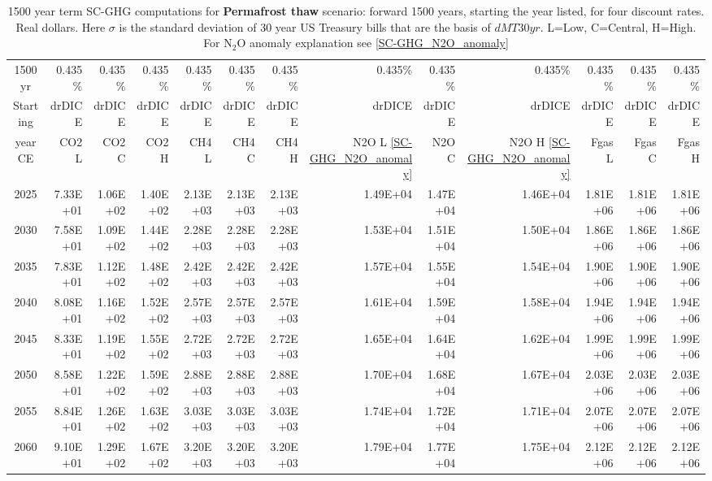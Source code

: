 \documentclass{article}
\begin{document}
\begin{table}
   \caption{1500 year term SC-GHG computations for \textbf{Permafrost thaw}  \cite{Schuur2022PermafrostFeedbacksWarming} scenario: forward 1500 years, starting the year listed, for four discount rates. Real dollars. Here $\sigma$ is the standard deviation of 30 year US Treasury bills that are the basis of $dMT30yr$. L=Low, C=Central, H=High. For N$_2$O anomaly explanation see \ref{SC-GHG_N2O_anomaly}} 
\label{PVs_1500_yearSCC_S2}
\small
\begin{tabular}{crrr|rrr|rrr|rrr}
1500 yr  & 0.435\%  & 0.435\%  & 0.435\%  & 0.435\%  & 0.435\%  & 0.435\%  & 0.435\%  & 0.435\%  & 0.435\%  & 0.435\%  & 0.435\%  & 0.435\%  \\
Starting & drDICE   & drDICE   & drDICE   & drDICE   & drDICE   & drDICE   & drDICE   & drDICE   & drDICE   & drDICE   & drDICE   & drDICE   \\
year CE  & CO2 L    & CO2 C    & CO2 H    & CH4 L    & CH4 C    & CH4 H    & N2O L \ref{SC-GHG_N2O_anomaly}     & N2O C      & N2O H \ref{SC-GHG_N2O_anomaly}    & Fgas L   & Fgas C   & Fgas H   \\
2025     & 7.33E+01 & 1.06E+02 & 1.40E+02 & 2.13E+03 & 2.13E+03 & 2.13E+03 & 1.49E+04 & 1.47E+04 & 1.46E+04 & 1.81E+06 & 1.81E+06 & 1.81E+06 \\
2030     & 7.58E+01 & 1.09E+02 & 1.44E+02 & 2.28E+03 & 2.28E+03 & 2.28E+03 & 1.53E+04 & 1.51E+04 & 1.50E+04 & 1.86E+06 & 1.86E+06 & 1.86E+06 \\
2035     & 7.83E+01 & 1.12E+02 & 1.48E+02 & 2.42E+03 & 2.42E+03 & 2.42E+03 & 1.57E+04 & 1.55E+04 & 1.54E+04 & 1.90E+06 & 1.90E+06 & 1.90E+06 \\
2040     & 8.08E+01 & 1.16E+02 & 1.52E+02 & 2.57E+03 & 2.57E+03 & 2.57E+03 & 1.61E+04 & 1.59E+04 & 1.58E+04 & 1.94E+06 & 1.94E+06 & 1.94E+06 \\
2045     & 8.33E+01 & 1.19E+02 & 1.55E+02 & 2.72E+03 & 2.72E+03 & 2.72E+03 & 1.65E+04 & 1.64E+04 & 1.62E+04 & 1.99E+06 & 1.99E+06 & 1.99E+06 \\
2050     & 8.58E+01 & 1.22E+02 & 1.59E+02 & 2.88E+03 & 2.88E+03 & 2.88E+03 & 1.70E+04 & 1.68E+04 & 1.67E+04 & 2.03E+06 & 2.03E+06 & 2.03E+06 \\
2055     & 8.84E+01 & 1.26E+02 & 1.63E+02 & 3.03E+03 & 3.03E+03 & 3.03E+03 & 1.74E+04 & 1.72E+04 & 1.71E+04 & 2.07E+06 & 2.07E+06 & 2.07E+06 \\
2060     & 9.10E+01 & 1.29E+02 & 1.67E+02 & 3.20E+03 & 3.20E+03 & 3.20E+03 & 1.79E+04 & 1.77E+04 & 1.75E+04 & 2.12E+06 & 2.12E+06 & 2.12E+06 \\

\end{tabular}
\end{table}
\end{document}
